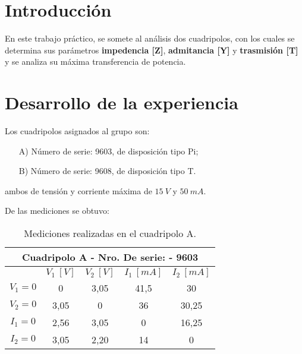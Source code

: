 \documentclass[a4paper]{article}
\begin{document}




\section*{Introducción}

En este trabajo práctico, se somete al análisis dos cuadripolos, con los cuales se determina sus parámetros \textbf{impedencia [Z]}, \textbf{admitancia [Y]} y \textbf{trasmisión [T]} y se analiza su máxima transferencia de potencia.

\section*{Desarrollo de la experiencia}

Los cuadripolos asignados al grupo son:
\begin{enumerate}
	\item[A)] Número de serie: 9603, de disposición tipo Pi;
	\item[B)] Número de serie: 9608, de disposición tipo T.
\end{enumerate}
ambos de tensión y corriente máxima de $15 \ V$ y $50 \ mA$.

De las mediciones se obtuvo:

\begin{table}[H]
\begin{center}
\begin{tabular}{|c|c|c|c|c|}
\hline
\multicolumn{5}{|c|}{Cuadripolo A - Nro. De serie: - 9603} \\ \hline
 & $V_1 \ [V]$ & $V_2 \ [V]$ & $I_1 \ [mA]$ & $I_2 \ [mA]$ \\ \hline
$V_1 = 0$ & 0 & 3,05 & 41,5 & 30 \\ \hline
$V_2 = 0$ & 3,05 & 0 & 36 & 30,25 \\ \hline
$I_1 = 0$ & 2,56 & 3,05 & 0 & 16,25 \\ \hline
$I_2 = 0$ & 3,05 & 2,20 & 14 & 0 \\ \hline
\end{tabular}
\caption{Mediciones realizadas en el cuadripolo A.}
\end{center}
\end{table}
\end{document}
